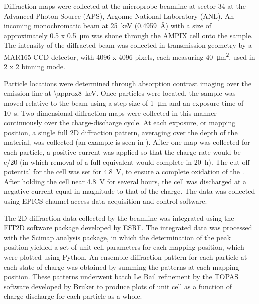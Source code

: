 \documentclass{article}
\begin{document}
Diffraction maps were collected at the microprobe beamline at sector
34 at the Advanced Photon Source (APS), Argonne National Laboratory
(ANL). An incoming monochromatic beam at \SI{25}{\kilo\electronvolt}
(\SI{0.4959}{\angstrom}) with a size of approximately \num{0.5} x
\SI{0.5}{\micro\meter} was shone through the AMPIX cell onto the
sample. The intensity of the diffracted beam was collected in
transmission geometry by a MAR165 CCD detector, with 4096 x 4096
pixels, each measuring \SI{40}{\square\micro\meter}, used in 2 x 2
binning mode.

Particle locations were determined through absorption contrast imaging
over the  emission line at
\SI{\approx8}{\kilo\electronvolt}. Once particles were located, the
sample was moved relative to the beam using a step size of
\SI{1}{\micro\meter} and an exposure time of
\SI{10}{\second}. Two-dimensional diffraction maps were collected in
this manner continuously over the charge-discharge cycle. At each
exposure, or mapping position, a single full 2D diffraction pattern,
averaging over the depth of the material, was collected (an example is
seen in ). After one map was collected for each
particle, a positive current was applied so that the charge rate would
be c/20 (in which removal of a full  equivalent would complete
in \SI{20}{\hour}). The cut-off potential for the cell was set for
\SI{4.8}{\volt}, to ensure a complete oxidation of the \nca{}. After
holding the cell near \SI{4.8}{\volt} for several hours, the cell was
discharged at a negative current equal in magnitude to that of the
charge. The data was collected using EPICS channel-access data
acquisition and control software.

The 2D diffraction data collected by the beamline was integrated using
the FIT2D software package developed by
ESRF\cite{hausermann1996,hammersley1997}. The integrated data was
processed with the Scimap analysis package\cite{scimap}, in which the
determination of the peak position yielded a set of unit cell
parameters for each mapping position, which were plotted using
Python. An ensemble diffraction pattern for each particle at each
state of charge was obtained by summing the patterns at each mapping
position. These patterns underwent batch Le Bail refinement by the
TOPAS software developed by Bruker to produce plots of unit cell as a
function of charge-discharge for each particle as a whole.
\end{document}
